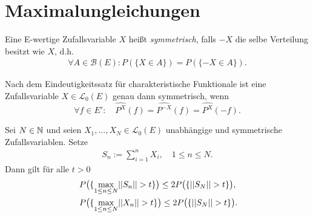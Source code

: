 \section{Maximalungleichungen}

\begin{mydef}
    Eine E-wertige Zufallsvariable $X$ heißt \textit{symmetrisch}, falls $-X$ die selbe Verteilung besitzt wie $X$, d.h.
    \begin{align*}
        \forall A \in \mathcal{B}(E): P(\{X \in A\}) = P(\{-X \in A\}). 
    \end{align*}
\end{mydef}

\begin{remark}
    Nach dem Eindeutigkeitssatz für charakteristische Funktionale ist eine Zufallsvariable $X \in \mathcal{L}_0(E)$ genau dann symmetrisch, wenn 
    $$
        \forall f \in E': \quad \widehat{P^X}(f) = \widehat{P^{-X}}(f) = \widehat{P^X}(-f). 
    $$
\end{remark}

\begin{theorem}
    Sei $N \in \mathbb{N}$ und seien $X_1,...,X_N \in \mathcal{L}_0(E)$ unabhängige und symmetrische Zufallsvariablen. Setze 
    \begin{align*}
        S_n := \sum_{i=1}^n X_i, \quad 1 \leq n \leq N. 
    \end{align*}
    Dann gilt für alle $t > 0$
    \begin{align}
        &P\big(\{ \max_{1 \leq n \leq N} \lvert\lvert S_n \rvert\rvert > t \}\big) \leq 2 P\big(\{\lvert\lvert S_N \rvert\rvert > t \}\big), \\\
        &P\big(\{ \max_{1 \leq n \leq N} \lvert\lvert X_n \rvert\rvert > t \}\big) \leq 2 P\big(\{\lvert\lvert S_N \rvert\rvert > t \}\big).
    \end{align}
\end{theorem}

